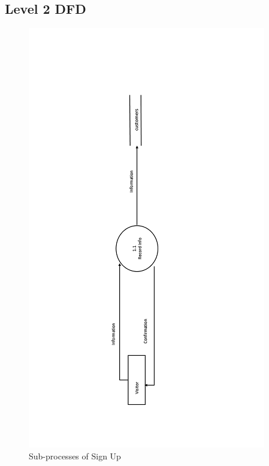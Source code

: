 \subsection{ Level 2 DFD }
 \begin{figure}
 \centering
\includegraphics{figures/1final.png}
\caption{Sub-processes of Sign Up}
\end{figure}






